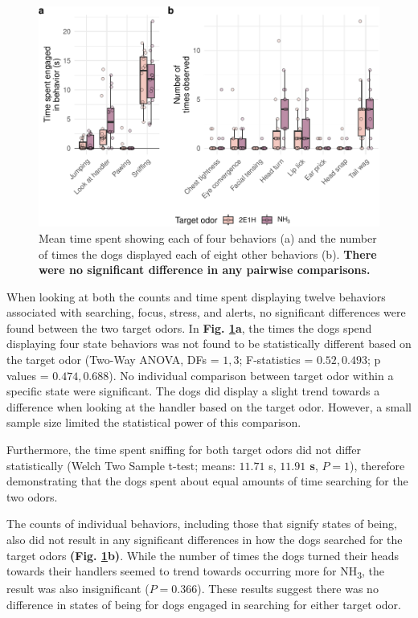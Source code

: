 \documentclass[
]{article}
\begin{document}
\begin{figure}
\centering
\includegraphics{main-manuscript_files/figure-latex/indiv-behavior-times-1.pdf}
\caption{\label{fig:indiv-behavior-times}Mean time spent showing each of four behaviors (a) and the number of times the dogs displayed each of eight other behaviors (b). \textbf{There were no significant difference in any pairwise comparisons.}}
\end{figure}

When looking at both the counts and time spent displaying twelve behaviors associated with searching, focus, stress, and alerts, no significant differences were found between the two target odors. In \textbf{Fig. \ref{fig:indiv-behavior-times}a}, the times the dogs spend displaying four state behaviors was not found to be statistically different based on the target odor (Two-Way ANOVA, DFs = \(1, 3\); F-statistics = \(0.52, 0.493\); p values = \(0.474, 0.688\)). No individual comparison between target odor within a specific state were significant. The dogs did display a slight trend towards a difference when looking at the handler based on the target odor. However, a small sample size limited the statistical power of this comparison.

Furthermore, the time spent sniffing for both target odors did not differ statistically (Welch Two Sample t-test; means: \(11.71\) s, \textbf{\(11.91\) s}, \(P = 1\)), therefore demonstrating that the dogs spent about equal amounts of time searching for the two odors.

The counts of individual behaviors, including those that signify states of being, also did not result in any significant differences in how the dogs searched for the target odors \textbf{(Fig. \ref{fig:indiv-behavior-times}b)}. While the number of times the dogs turned their heads towards their handlers seemed to trend towards occurring more for NH\textsubscript{3}, the result was also insignificant (\(P = 0.366\)). These results suggest there was no difference in states of being for dogs engaged in searching for either target odor.
\end{document}
